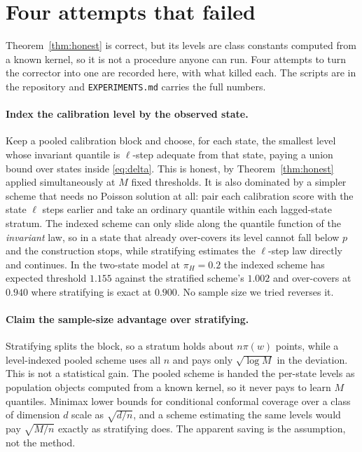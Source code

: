 \documentclass[11pt]{article}
\theoremstyle{definition}
\theoremstyle{remark}
\begin{document}
\section{Four attempts that failed}\label{sec:failed}

Theorem~\ref{thm:honest} is correct, but its levels are class constants computed from a known
kernel, so it is not a procedure anyone can run. Four attempts to turn the corrector into one are
recorded here, with what killed each. The scripts are in the repository and
\texttt{EXPERIMENTS.md} carries the full numbers.

\paragraph{Index the calibration level by the observed state.} Keep a pooled calibration block
and choose, for each state, the smallest level whose invariant quantile is $\ell$-step adequate from
that state, paying a union bound over states inside \eqref{eq:delta}. This is honest, by
Theorem~\ref{thm:honest} applied simultaneously at $M$ fixed thresholds. It is also dominated by a
simpler scheme that needs no Poisson solution at all: pair each calibration score with the state
$\ell$ steps earlier and take an ordinary quantile within each lagged-state stratum. The indexed
scheme can only slide along the quantile function of the \emph{invariant} law, so in a state that
already over-covers its level cannot fall below $p$ and the construction stops, while stratifying
estimates the $\ell$-step law directly and continues. In the two-state model at $\pi_H=0.2$ the
indexed scheme has expected threshold $1.155$ against the stratified scheme's $1.002$ and
over-covers at $0.940$ where stratifying is exact at $0.900$. No sample size we tried reverses it.

\paragraph{Claim the sample-size advantage over stratifying.} Stratifying splits the block, so a
stratum holds about $n\pi(w)$ points, while a level-indexed pooled scheme uses all $n$ and pays only
$\sqrt{\log M}$ in the deviation. This is not a statistical gain. The pooled scheme is handed the
per-state levels as population objects computed from a known kernel, so it never pays to learn $M$
quantiles. Minimax lower bounds for conditional conformal coverage over a class of dimension $d$
scale as $\sqrt{d/n}$, and a scheme estimating the same levels would pay $\sqrt{M/n}$ exactly as
stratifying does. The apparent saving is the assumption, not the method.
\end{document}
